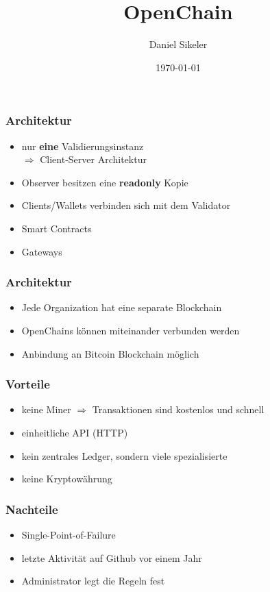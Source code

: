 \documentclass[17pt]{beamer}
\title{OpenChain}
\author{Daniel Sikeler}
\date{\today}
\begin{document}
\maketitle

\begin{frame}
\frametitle{Architektur}
\begin{itemize}
	\item nur \textbf{eine} Validierungsinstanz \\ $\Rightarrow$ Client-Server Architektur
	\item Observer besitzen eine \textbf{readonly} Kopie
	\item Clients/Wallets verbinden sich mit dem Validator
	\item Smart Contracts
	\item Gateways
\end{itemize}
\end{frame}

\begin{frame}
\frametitle{Architektur}
\begin{itemize}
	\item Jede Organization hat eine separate Blockchain
	\item OpenChains können miteinander verbunden werden
	\item Anbindung an Bitcoin Blockchain möglich
\end{itemize}
\end{frame}

\begin{frame}
\frametitle{Vorteile}
\begin{itemize}
	\item keine Miner $\Rightarrow$ Transaktionen sind kostenlos und schnell
	\item einheitliche API (HTTP)
	\item kein zentrales Ledger, sondern viele spezialisierte
	\item keine Kryptowährung
\end{itemize}
\end{frame}

\begin{frame}
\frametitle{Nachteile}
\begin{itemize}
	\item Single-Point-of-Failure
	\item letzte Aktivität auf Github vor einem Jahr
	\item Administrator legt die Regeln fest
\end{itemize}
\end{frame}
\end{document}
